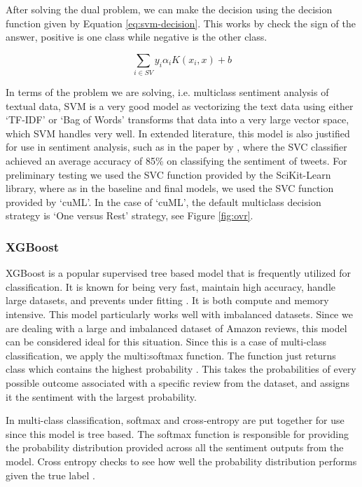 \documentclass[stu,12pt,floatsintext]{apa7}
\begin{document}
After solving the dual problem, we can make the decision using the decision function given by Equation \ref{eq:svm-decision}. This works by check the sign of the answer, positive is one class while negative is the other class.

\begin{equation}
\sum_{i\in SV} y_i \alpha_i K(x_i, x) + b
\label{eq:svm-decision}
\end{equation}

In terms of the problem we are solving, i.e. multiclass sentiment analysis of textual data, SVM is a very good model as vectorizing the text data using either `TF-IDF' or `Bag of Words' transforms that data into a very large vector space, which SVM handles very well. In extended literature, this model is also justified for use in sentiment analysis, such as in the paper by \textcite{gupta2017study}, where the SVC classifier achieved an average accuracy of 85\% on classifying the sentiment of tweets. For preliminary testing we used the SVC function provided by the SciKit-Learn library, where as in the baseline and final models, we used the SVC function provided by `cuML'. In the case of `cuML', the default multiclass decision strategy is `One versus Rest' strategy, see Figure \ref{fig:ovr}.


\subsubsection{XGBoost}
XGBoost is a popular supervised tree based model that is frequently utilized for classification. It is known for being very fast, maintain high accuracy, handle large datasets, and prevents under fitting \parencite{GuptaComparisons}. It is both compute and memory intensive. This model particularly works well with imbalanced datasets. Since we are dealing with a large and imbalanced dataset of Amazon reviews, this model can be considered ideal for this situation. Since this is a case of multi-class classification, we apply the multi:softmax function. The function just returns class which contains the highest probability \parencite{forecastegy_xgboost_multiclass_classification}. This takes the probabilities of every possible outcome associated with a specific review from the dataset, and assigns it the sentiment with the largest probability. 

In multi-class classification, softmax and cross-entropy are put together for use since this model is tree based. The softmax function is responsible for providing the probability distribution provided across all the sentiment outputs from the model. Cross entropy checks to see how well the probability distribution performs given the true label \parencite{charanhu_2023}. 
\end{document}

